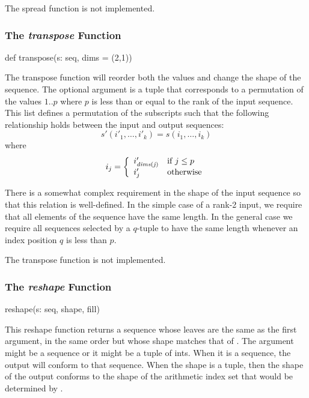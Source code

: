 \begin{implementation}
The spread function is not implemented.
\end{implementation}

\subsubsection{The {\em transpose} Function}
\label{The_em_transpose_Function}

\begin{chapel}
def transpose(s: seq, dims = (2,1))
\end{chapel}

The transpose function will reorder both the values and change the
shape of the sequence. The optional  argument is a tuple
that corresponds to a permutation of the values $1..p$ where $p$ is
less than or equal to the rank of the input sequence. This list
defines a permutation of the subscripts such that the following
relationship holds between the input and output sequences:
$$
    s'(i'_1,\ldots,i'_k) = s(i_1,\ldots,i_k)
$$
where
$$
    i_j = \left\{\begin{array}{ll}
                 i'_{\it dims(j)} & \mbox{if $j\le p$}\\
		 i'_j & \mbox{otherwise}
		 \end{array}
          \right.
$$

There is a somewhat complex requirement in the shape of the input
sequence so that this relation is well-defined. In the simple case of
a rank-2 input, we require that all elements of the sequence have the
same length.  In the general case we require all sequences selected by
a $q$-tuple to have the same length whenever an index position $q$ is
less than $p$.

\begin{implementation}
The transpose function is not implemented.
\end{implementation}

\subsubsection{The {\em reshape} Function}
\label{The_em_reshape_Function}

\begin{chapel}
reshape(s: seq, shape, fill)
\end{chapel}

This reshape function returns a sequence whose leaves are the same as
the first argument, in the same order but whose shape matches that
of . The  argument might be a sequence or it
might be a tuple of ints. When it is a sequence, the output will
conform to that sequence. When the shape is a tuple, then the shape of
the output conforms to the shape of the arithmetic index set that
would be determined by .

